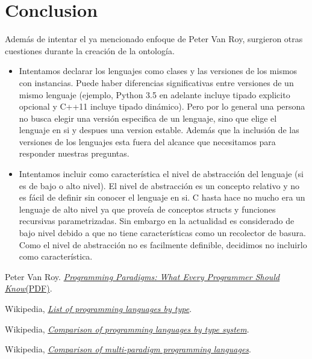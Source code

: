 \documentclass[12pt, titlepage, a4paper]{article}
\begin{document}
\section{Conclusion}
Además de intentar el ya mencionado enfoque de Peter Van Roy, surgieron otras
cuestiones durante la creación de la ontología.

\begin{itemize}
    \item Intentamos declarar los lenguajes como clases y las versiones de los mismos con instancias.
    Puede haber diferencias significativas entre versiones de un mismo lenguaje (ejemplo, Python 3.5 en adelante
    incluye tipado explicito opcional y C++11 incluye tipado dinámico). Pero por lo general una persona no busca elegir
    una versión especifica de un lenguaje, sino que elige el lenguaje en si y despues una version estable.  Además que
    la inclusión de las versiones de los lenguajes esta fuera del alcance que necesitamos para responder nuestras preguntas.
    \item Intentamos incluir como característica el nivel de abstracción del lenguaje (si es de bajo o alto nivel).
    El nivel de abstracción es un concepto relativo y no es fácil de definir sin conocer el lenguaje en si. C hasta hace no mucho
    era un lenguaje de alto nivel ya que proveía de conceptos structs y funciones recursivas parametrizadas. Sin embargo en la actualidad
    es considerado de bajo nivel debido a que no tiene características como un recolector de basura. Como el nivel de abstracción no es facilmente
    definible, decidimos no incluirlo como característica.   
\end{itemize}

\begin{thebibliography}{999}

      Peter Van Roy. 
      \href{https://webperso.info.ucl.ac.be/~pvr/VanRoyChapter.pdf}{\emph{Programming Paradigms: What Every Programmer Should 
      Know}(PDF)}.
    
      Wikipedia, \href{https://en.wikipedia.org/wiki/List_of_programming_languages_by_type}{\emph{List of programming languages by type}}.
    
      Wikipedia, \href{https://en.wikipedia.org/wiki/Comparison_of_programming_languages_by_type_system}{\emph{Comparison of programming languages by type system}}.
    
      Wikipedia, \href{https://en.wikipedia.org/wiki/Comparison_of_multi-paradigm_programming_languages}{\emph{Comparison of multi-paradigm programming languages}}.
    
    
\end{thebibliography}
\end{document}
